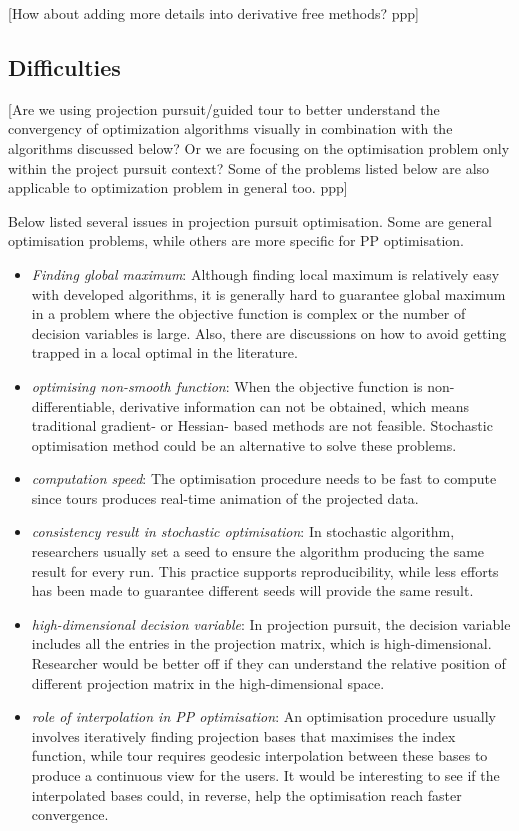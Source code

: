 \documentclass[12pt]{article}
\begin{document}
{[}How about adding more details into derivative free methods? ppp{]}

\hypertarget{difficulties}{%
\subsection{Difficulties}\label{difficulties}}

{[}Are we using projection pursuit/guided tour to better understand the
convergency of optimization algorithms visually in combination with the
algorithms discussed below? Or we are focusing on the optimisation
problem only within the project pursuit context? Some of the problems
listed below are also applicable to optimization problem in general too.
ppp{]}

Below listed several issues in projection pursuit optimisation. Some are
general optimisation problems, while others are more specific for PP
optimisation.

\begin{itemize}
\item
  \emph{Finding global maximum}: Although finding local maximum is
  relatively easy with developed algorithms, it is generally hard to
  guarantee global maximum in a problem where the objective function is
  complex or the number of decision variables is large. Also, there are
  discussions on how to avoid getting trapped in a local optimal in the
  literature.
\item
  \emph{optimising non-smooth function}: When the objective function is
  non-differentiable, derivative information can not be obtained, which
  means traditional gradient- or Hessian- based methods are not
  feasible. Stochastic optimisation method could be an alternative to
  solve these problems.
\item
  \emph{computation speed}: The optimisation procedure needs to be fast
  to compute since tours produces real-time animation of the projected
  data.
\item
  \emph{consistency result in stochastic optimisation}: In stochastic
  algorithm, researchers usually set a seed to ensure the algorithm
  producing the same result for every run. This practice supports
  reproducibility, while less efforts has been made to guarantee
  different seeds will provide the same result.
\item
  \emph{high-dimensional decision variable}: In projection pursuit, the
  decision variable includes all the entries in the projection matrix,
  which is high-dimensional. Researcher would be better off if they can
  understand the relative position of different projection matrix in the
  high-dimensional space.
\item
  \emph{role of interpolation in PP optimisation}: An optimisation
  procedure usually involves iteratively finding projection bases that
  maximises the index function, while tour requires geodesic
  interpolation between these bases to produce a continuous view for the
  users. It would be interesting to see if the interpolated bases could,
  in reverse, help the optimisation reach faster convergence.
\end{itemize}
\end{document}
